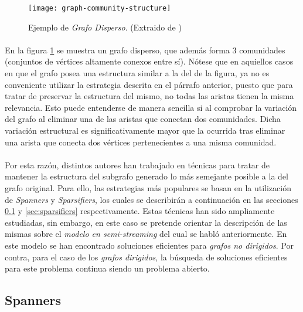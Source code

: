 \documentclass{subfiles}
\begin{document}
      \begin{figure}
        \centering
        \texttt{[image: graph-community-structure]}
        \caption{Ejemplo de \emph{Grafo Disperso}. (Extraido de \cite{wiki:Community_structure})}
        \label{img:graph_community_structure}
      \end{figure}

      \paragraph{}
      En la figura \ref{img:graph_community_structure} se muestra un grafo disperso, que además forma 3 comunidades (conjuntos de vértices altamente conexos entre sí). Nótese que en aquiellos casos en que el grafo posea una estructura similar a la del de la figura, ya no es conveniente utilizar la estrategia descrita en el párrafo anterior, puesto que para tratar de preservar la estructura del mismo, no todas las aristas tienen la misma relevancia. Esto puede entenderse de manera sencilla si al comprobar la variación del grafo al eliminar una de las aristas que conectan dos comunidades. Dicha variación estructural es significativamente mayor que la ocurrida tras eliminar una arista que conecta dos vértices pertenecientes a una misma comunidad.

      \paragraph{}
      Por esta razón, distintos autores han trabajado en técnicas para tratar de mantener la estructura del subgrafo generado lo más semejante posible a la del grafo original. Para ello, las estrategias más populares se basan en la utilización de \emph{Spanners} y \emph{Sparsifiers}, los cuales se describirán a continuación en las secciones \ref{sec:spanners} y \ref{sec:sparsifiers} respectivamente. Estas técnicas han sido ampliamente estudiadas, sin embargo, en este caso se pretende orientar la descripción de las mismas sobre el \emph{modelo en semi-streaming} del cual se habló anteriormente. En este modelo se han encontrado soluciones eficientes para \emph{grafos no dirigidos}. Por contra, para el caso de los \emph{grafos dirigidos}, la búsqueda de soluciones eficientes para este problema continua siendo un problema abierto.

      \subsection{Spanners}
      \label{sec:spanners}
\end{document}
